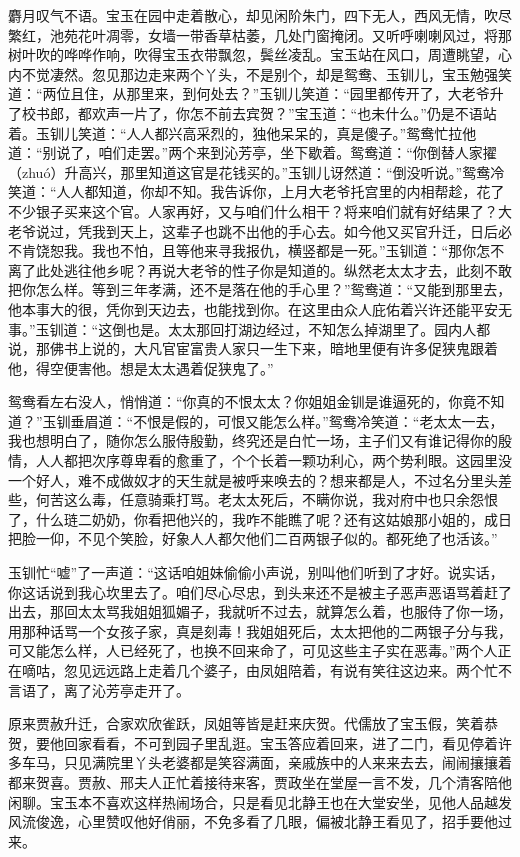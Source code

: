 \documentclass[12pt,oneside]{book}
\begin{document}
麝月叹气不语。宝玉在园中走着散心，却见闲阶朱门，四下无人，西风无情，吹尽繁红，池苑花叶凋零，女墙一带香草枯萎，几处门窗掩闭。又听呼喇喇风过，将那树叶吹的哗哗作响，吹得宝玉衣带飘忽，鬓丝凌乱。宝玉站在风口，周遭眺望，心内不觉凄然。忽见那边走来两个丫头，不是别个，却是鸳鸯、玉钏儿，宝玉勉强笑道：“两位且住，从那里来，到何处去？”玉钏儿笑道：“园里都传开了，大老爷升了校书郎，都欢声一片了，你怎不前去宾贺？”宝玉道：“也未什么。”仍是不语站着。玉钏儿笑道：“人人都兴高采烈的，独他呆呆的，真是傻子。”鸳鸯忙拉他道：“别说了，咱们走罢。”两个来到沁芳亭，坐下歇着。鸳鸯道：“你倒替人家擢（zhuó）升高兴，那里知道这官是花钱买的。”玉钏儿讶然道：“倒没听说。”鸳鸯冷笑道：“人人都知道，你却不知。我告诉你，上月大老爷托宫里的内相帮趁，花了不少银子买来这个官。人家再好，又与咱们什么相干？将来咱们就有好结果了？大老爷说过，凭我到天上，这辈子也跳不出他的手心去。如今他又买官升迁，日后必不肯饶恕我。我也不怕，且等他来寻我报仇，横竖都是一死。”玉钏道：“那你怎不离了此处逃往他乡呢？再说大老爷的性子你是知道的。纵然老太太才去，此刻不敢把你怎么样。等到三年孝满，还不是落在他的手心里？”鸳鸯道：“又能到那里去，他本事大的很，凭你到天边去，也能找到你。在这里由众人庇佑着兴许还能平安无事。”玉钏道：“这倒也是。太太那回打湖边经过，不知怎么掉湖里了。园内人都说，那佛书上说的，大凡官宦富贵人家只一生下来，暗地里便有许多促狭鬼跟着他，得空便害他。想是太太遇着促狭鬼了。”

鸳鸯看左右没人，悄悄道：“你真的不恨太太？你姐姐金钏是谁逼死的，你竟不知道？”玉钏垂眉道：“不恨是假的，可恨又能怎么样。”鸳鸯冷笑道：“老太太一去，我也想明白了，随你怎么服侍殷勤，终究还是白忙一场，主子们又有谁记得你的殷情，人人都把次序尊卑看的愈重了，个个长着一颗功利心，两个势利眼。这园里没一个好人，难不成做奴才的天生就是被呼来唤去的？想来都是人，不过名分里头差些，何苦这么毒，任意骑乘打骂。老太太死后，不瞒你说，我对府中也只余怨恨了，什么琏二奶奶，你看把他兴的，我咋不能瞧了呢？还有这姑娘那小姐的，成日把脸一仰，不见个笑脸，好象人人都欠他们二百两银子似的。都死绝了也活该。”

玉钏忙“嘘”了一声道：“这话咱姐妹偷偷小声说，别叫他们听到了才好。说实话，你这话说到我心坎里去了。咱们尽心尽忠，到头来还不是被主子恶声恶语骂着赶了出去，那回太太骂我姐姐狐媚子，我就听不过去，就算怎么着，也服侍了你一场，用那种话骂一个女孩子家，真是刻毒！我姐姐死后，太太把他的二两银子分与我，可又能怎么样，人已经死了，也换不回来命了，可见这些主子实在恶毒。”两个人正在嘀咕，忽见远远路上走着几个婆子，由凤姐陪着，有说有笑往这边来。两个忙不言语了，离了沁芳亭走开了。

原来贾赦升迁，合家欢欣雀跃，凤姐等皆是赶来庆贺。代儒放了宝玉假，笑着恭贺，要他回家看看，不可到园子里乱逛。宝玉答应着回来，进了二门，看见停着许多车马，只见满院里丫头老婆都是笑容满面，亲戚族中的人来来去去，闹闹攘攘着都来贺喜。贾赦、邢夫人正忙着接待来客，贾政坐在堂屋一言不发，几个清客陪他闲聊。宝玉本不喜欢这样热闹场合，只是看见北静王也在大堂安坐，见他人品越发风流俊逸，心里赞叹他好俏丽，不免多看了几眼，偏被北静王看见了，招手要他过来。
\end{document}
